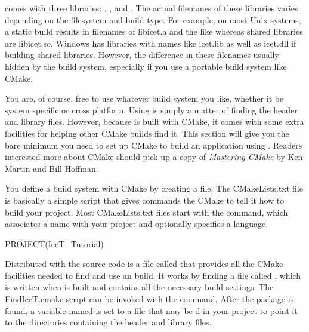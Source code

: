 \IceT comes with three libraries: ,
, and
.  The actual filenames of
these libraries varies depending on the filesystem and build type.  For
example, on most Unix systems, a static build results in filenames of
libicet.a and the like whereas shared libraries are
libicet.so.  Windows has libraries with names like icet.lib as well as
icet.dll if building shared libraries.  However, the difference in these
filenames usually hidden by the build system, especially if you use a
portable build system like CMake.

You are, of course, free to use whatever build system you like, whether it
be system specific or cross platform.  Using \IceT is simply a matter of
finding the header and library files.  However, because \IceT is built with
CMake, it comes with some extra facilities for helping other CMake builds
find it.  This section will give you the bare minimum you need to set up
CMake to build an application using \IceT.  Readers interested more about
CMake should pick up a copy of \emph{Mastering CMake} by Ken Martin and
Bill Hoffman.

You define a build system with CMake by creating a
 file.  The CMakeLists.txt
file is basically a simple script that gives commands the CMake to tell it
how to build your project.  Most CMakeLists.txt files start with the
 command, which associates a name with your project and
optionally specifies a language.
\begin{code}
PROJECT(IceT_Tutorial)
\end{code}

Distributed with the \IceT source code is a file called
 that provides all the CMake
facilities needed to find and use an \IceT build.  It works by finding a
file called , which is
written when \IceT is built and contains all the necessary build settings.
The FindIceT.cmake script can be invoked with the 
command.  After the \IceT package is found, a variable named
 is set to a file that may be d in
your project to point it to the directories containing the header and
library files.

